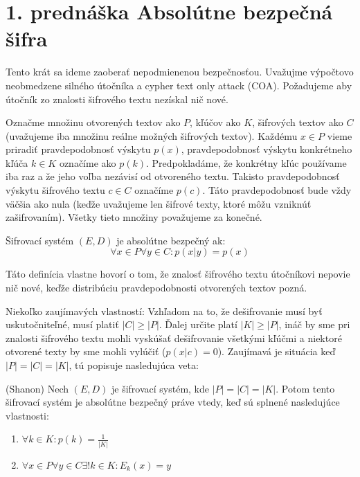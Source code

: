 \section{1. prednáška Absolútne bezpečná šifra}

Tento krát sa ideme zaoberať nepodmienenou bezpečnosťou. Uvažujme 
výpočtovo neobmedzene silného útočníka a cypher text only attack (COA).
Požadujeme aby útočník zo znalosti šifrového textu nezískal nič nové.

Označme množinu otvorených textov ako $P$, kľúčov ako $K$, šifrových textov ako $C$
(uvažujeme iba množinu reálne možných šifrových textov). Každému $x \in P$ vieme priradiť
pravdepodobnosť výskytu $p(x)$, pravdepodobnosť
výskytu konkrétneho kľúča $k \in K$ označíme ako $p(k)$. Predpokladáme, že
konkrétny kľúc používame iba raz a že jeho voľba nezávisí od otvoreného textu.
Takisto pravdepodobnosť výskytu šifrového textu $c \in C$ označíme $p(c)$. Táto pravdepodobnosť
bude vždy väčšia ako nula (keďže uvažujeme len šifrové texty, ktoré môžu vzniknúť zašifrovaním).
Všetky tieto množiny považujeme za konečné.

\begin{definicia}
Šifrovací systém $(E,D)$ je absolútne bezpečný ak:
$$\forall x \in P \forall y \in C\colon p(x | y) = p(x)$$
\end{definicia}
\begin{komentar}
Táto definícia vlastne hovorí o tom, že znalosť šifrového textu útočníkovi nepovie nič
nové, keďže distribúciu pravdepodobnosti otvorených textov pozná.
\end{komentar}

Niekoľko zaujímavých vlastností:
Vzhľadom na to, že dešifrovanie musí byť uskutočniteľné, musí platiť $|C| \geq |P|$.
Ďalej určite platí $|K| \geq |P|$, ináč by sme pri znalosti šifrového textu mohli 
vyskúšať dešifrovanie všetkými kľúčmi a niektoré otvorené texty by sme mohli vylúčiť
($p(x|c) = 0$). Zaujímavá je situácia keď $|P| = |C| = |K|$, tú popisuje nasledujúca veta:

\begin{veta}{(Shanon)}
Nech $(E,D)$ je šifrovací systém, kde $|P|=|C|=|K|$. Potom tento šifrovací systém je
absolútne bezpečný práve vtedy, keď sú splnené nasledujúce vlastnosti:
\begin{enumerate}
\item $\forall k \in K\colon p(k) = \frac{1}{|K|}$
\item $\forall x \in P \forall y \in C \exists! k \in K\colon E_k(x) = y$
\end{enumerate}
\end{veta}

